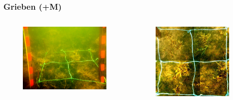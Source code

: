 \documentclass{beamer}
\begin{document}
\begin{frame}
\frametitle{Grieben (+M)}
\begin{columns}
\begin{column}{7.0cm}
\begin{figure}
\includegraphics[height=0.5\textheight]{images/plotpictures/Bsp_G+M}
\hspace*{-9mm}
\end{figure}
\end{column}
\begin{column}{5.8cm}
\begin{figure}
\includegraphics[height=0.5\textheight]{images/Fotos/griebenvonoben.jpg}
\hspace*{+9mm}
\end{figure}
\end{column}
\end{columns}
\end{frame}
\end{document}
